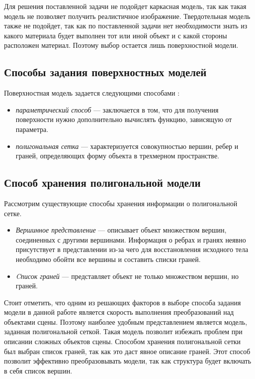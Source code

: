 Для решения поставленной задачи не подойдет каркасная модель, так как такая модель не позволяет получить реалистичное изображение. Твердотельная модель также не подойдет, так как по поставленной задачи нет необходимости знать из какого материала будет выполнен тот или иной объект и с какой стороны расположен материал.
Поэтому выбор остается лишь поверхностной модели.

\subsection{Способы задания поверхностных моделей}

Поверхностная модель задается следующими способами \cite{roders}:
\begin{itemize}
	\item \textit{параметрический способ} --- заключается в том, что для получения поверхности нужно дополнительно вычислять функцию, зависящую от параметра. 
	\item \textit{полигональная сетка} --- характеризуется совокупностью вершин, ребер и граней, определяющих форму объекта в трехмерном пространстве.
\end{itemize}

\subsection{Способ хранения полигональной модели}

Рассмотрим существующие способы хранения информации о полигональной сетке.
\begin{itemize}
	\item \textit{Вершинное представление} --- описывает объект множеством вершин, соединенных с другими вершинами.
	Информация о ребрах и гранях неявно присутствует в представлении из-за чего для восстановления исходного тела необходимо обойти все вершины и составить списки граней.
	\item \textit{Cписок граней} --- представляет объект не только множеством вершин, но граней.
	
\end{itemize}

Стоит отметить, что одним из решающих факторов в выборе способа задания модели в данной работе является скорость выполнения преобразований над объектами сцены.
Поэтому наиболее удобным представлением является модель, заданная полигональной сеткой. 
Такая модель позволит избежать проблем при описании сложных объектов сцены. 
Способом хранения полигональной сетки был выбран список граней, так как это даст явное описание граней. 
Этот способ позволит эффективно преобразовывать модели, так как структура будет включать в себя список вершин.

